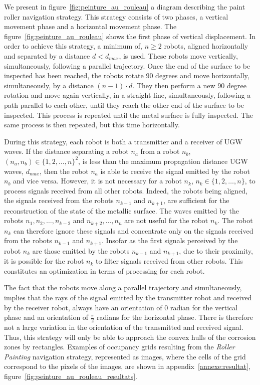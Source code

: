 We present in figure~\ref{fig:peinture_au_rouleau} a diagram describing the paint roller navigation strategy.
This strategy consists of two phases, a vertical movement phase and a horizontal movement phase.
The figure~\ref{fig:peinture_au_rouleau} shows the first phase of vertical displacement.
In order to achieve this strategy, a minimum of, $n \ge 2$ robots, aligned horizontally and separated by a distance $d < d_{max}$, is used.
These robots move vertically, simultaneously, following a parallel trajectory.
Once the end of the surface to be inspected has been reached, the robots rotate 90 degrees and move horizontally, simultaneously, by a distance $(n - 1) \cdot d$.
They then perform a new 90 degree rotation and move again vertically, in a straight line, simultaneously, following a path parallel to each other, until they reach the other end of the surface to be inspected.
This process is repeated until the metal surface is fully inspected.
The same process is then repeated, but this time horizontally.

During this strategy, each robot is both a transmitter and a receiver of UGW waves.
If the distance separating a robot $n_a$ from a robot $n_b$, $(n_a, n_b) \in \{1, 2, \dots, n\}^2$, is less than the maximum propagation distance UGW waves, $d_{max}$, then the robot $n_a$ is able to receive the signal emitted by the robot $n_b$ and vice versa.
However, it is not necessary for a robot $n_k$, $n_k \in \{1, 2, \dots, n\}$, to process signals received from all other robots.
Indeed, the robots being aligned, the signals received from the robots $n_{k-1}$ and $n_{k+1}$, are sufficient for the reconstruction of the state of the metallic surface.
The waves emitted by the robots $n_1, n_2, \dots, n_{k-2}$ and $n_{k+2}, \dots, n_n$ are not useful for the robot $n_k$.
The robot $n_k$ can therefore ignore these signals and concentrate only on the signals received from the robots $n_{k-1}$ and $n_{k+1}$.
Insofar as the first signals perceived by the robot $n_k$ are those emitted by the robots $n_{k-1}$ and $n_{k+1}$, due to their proximity, it is possible for the robot $n_k$ to filter signals received from other robots.
This constitutes an optimization in terms of processing for each robot.

The fact that the robots move along a parallel trajectory and simultaneously, implies that the rays of the signal emitted by the transmitter robot and received by the receiver robot, always have an orientation of $0$ radian for the vertical phase and an orientation of $\frac{\pi}{2}$ radians for the horizontal phase.
There is therefore not a large variation in the orientation of the transmitted and received signal.
Thus, this strategy will only be able to approach the convex hulls of the corrosion zones by rectangles.
Examples of occupancy grids resulting from the \textit{Roller Painting} navigation strategy, represented as images, where the cells of the grid correspond to the pixels of the images, are shown in appendix~\ref{annexe:resultat}, figure~\ref{fig:peinture_au_rouleau_resultats}.

